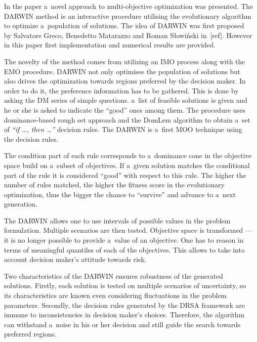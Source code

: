 In the paper a~novel approach to multi-objective optimization was
presented. The DARWIN method is an interactive procedure utilising the
evolutionary algorithm to optimize a~population of solutions. The idea of
DARWIN was first proposed by Salvatore Greco, Benedetto Matarazzo and Roman
Słowiński in~[ref]. However in this paper first implementation and numerical
results are provided.

The novelty of the method comes from utilizing an IMO process along with the
EMO procedure. DARWIN not only optimises the population of solutions but also
drives the optimization towards regions preferred by the decision maker. In
order to do it, the preference information has to be gathered. This is done by
asking the DM series of simple questions. a~list of feasible solutions is
given and he or she is asked to indicate the ``good'' ones among them. The
procedure uses dominance-based rough set approach and the DomLem algorithm to
obtain a~set of \textit{``if \dots, then \dots''} decision rules. The DARWIN
is a~first MOO technique using the decision rules.

The condition part of each rule corresponds to a~dominance cone in the
objective space build on a~subset of objectives. If a~given solution matches
the conditional part of the rule it is considered ``good'' with respect to
this rule. The higher the number of rules matched, the higher the fitness
score in the evolutionary optimization, thus the bigger the chance to
``survive'' and advance to a~next generation.

The DARWIN allows one to use intervals of possible values in the problem
formulation. Multiple scenarios are then tested. Objective space is
transformed --- it is no longer possible to provide a~value of an
objective. One has to reason in terms of meaningful quantiles of each of the
objectives. This allows to take into account decision maker's attitude towards
risk.

Two characteristics of the DARWIN ensures robustness of the generated
solutions. Firstly, each solution is tested on multiple scenarios of
uncertainty, so its characteristics are known even considering fluctuations in
the problem parameters. Secondly, the decision rules generated by the DRSA
framework are immune to inconsistencies in decision maker's
choices. Therefore, the algorithm can withstand a~noise in his or her decision
and still guide the search towards preferred regions.


